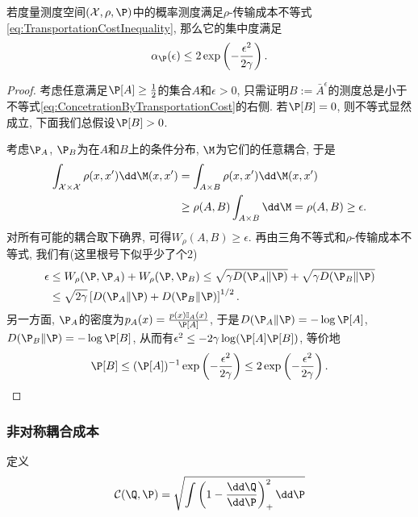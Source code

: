 \begin{theorem}
	若度量测度空间$(\cX, \rho, \P)$中的概率测度满足$\rho$-传输成本不等式\eqref{eq:TransportationCostInequality}, 那么它的集中度满足
	\begin{equation}\label{eq:ConcetrationByTransportationCost}
		\alpha_{\P}(\epsilon) \leq 2 \exp \left(- \frac{\epsilon^2}{2 \gamma} \right).
	\end{equation}
\end{theorem}
\begin{proof}
	考虑任意满足$\P[A] \geq \frac12$的集合$A$和$\epsilon > 0$, 只需证明$B := \bar A^{\epsilon}$的测度总是小于不等式\eqref{eq:ConcetrationByTransportationCost}的右侧. 
	若$\P[B] = 0$, 则不等式显然成立, 下面我们总假设$\P[B] > 0$. 
	
	考虑$\P_A$, $\P_B$为在$A$和$B$上的条件分布, $\M$为它们的任意耦合, 于是
	\begin{align*}
		\int_{\cX \times \cX} \rho(x, x') \dd \M(x, x')
		&= \int_{A \times B} \rho(x, x') \dd \M(x, x') \\
		&\geq \rho(A, B) \int_{A \times B} \dd \M 
		= \rho(A, B) 
		\geq \epsilon. 
	\end{align*}
	对所有可能的耦合取下确界, 可得$W_{\rho}(A, B) \geq \epsilon$. 
	再由三角不等式和$\rho$-传输成本不等式, 我们有(这里根号下似乎少了个2)
	\begin{align*}
		\epsilon 
		&\leq W_{\rho}(\P, \P_A) + W_{\rho}(\P, \P_B) 
		\leq \sqrt{\gamma D(\P_A \| \P)} + \sqrt{\gamma D(\P_B \| \P)} \\
		&\leq \sqrt{2 \gamma} \left[ D(\P_A \| \P) + D(\P_B \| \P) \right]^{1/2}.
	\end{align*}
	另一方面, $\P_A$的密度为$p_A(x) = \frac{p(x) \mathbb I_A(x)}{\P[A]}$, 于是$D(\P_A \| \P) = - \log \P[A]$, $D(\P_B \| \P) = -\log \P[B]$, 从而有$\epsilon^2 \leq -  2 \gamma \log (\P[A] \P[B])$, 等价地
	\begin{equation*}
		 \P[B] 
		 \leq (\P[A])^{-1} \exp\left(- \frac{\epsilon^2}{2 \gamma} \right) 
		 \leq 2 \exp\left(- \frac{\epsilon^2}{2 \gamma} \right). 
	\end{equation*}
\end{proof}



\subsubsection{非对称耦合成本}

定义
\begin{align*}
	\cC(\Q, \P)
	= \sqrt{\int\left(1 - \frac{\dd \Q}{\dd \P} \right)_+^2 \dd \P}
\end{align*}

